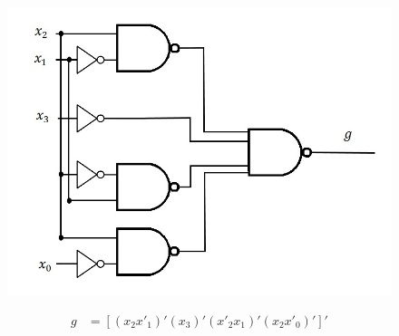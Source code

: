 \documentclass{article}
\begin{document}
\begin{figure}[h!]
\centering
\includegraphics[scale=0.25]{g-NAND-NAND}
\end{figure}
\begin{equation*}
\begin{split}
g & = [ (x_2 x'_1)' (x_3)' (x'_2 x_1)' (x_2 x'_0)' ]' \\
\end{split}
\end{equation*}

\clearpage
\end{document}
